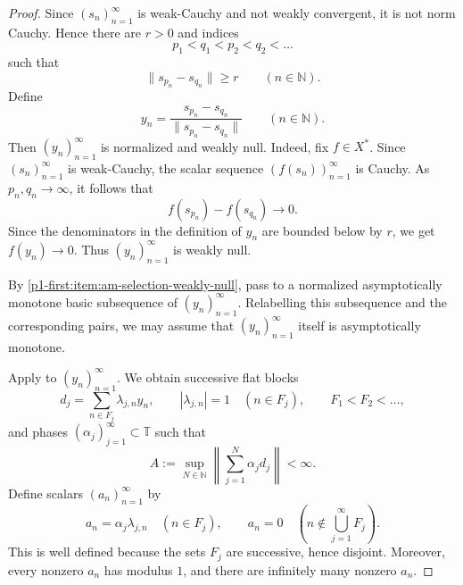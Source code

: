 \documentclass[11pt,reqno]{amsart}
\makeatletter
\theoremstyle{plain}
\theoremstyle{definition}
\newcommand{\N}{\mathbb N}
\newcommand{\T}{\mathbb T}
\newcounter{problempaper}
\newenvironment{problempaperbody}{%
  \setcounter{subsection}{0}%
  \setcounter{subsubsection}{0}%
  \setcounter{paragraph}{0}%
  \renewcommand{\thesubsection}{\arabic{subsection}}%
  \renewcommand{\thesubsubsection}{\thesubsection.\arabic{subsubsection}}%
  \renewcommand{\theparagraph}{\thesubsubsection.\arabic{paragraph}}%
  \let\problem@outersection\section
  \let\problem@outersubsection\subsection
  \let\problem@outersubsubsection\subsubsection
  \let\problem@outerparagraph\paragraph
  \let\section\problem@papersection
  \let\subsection\problem@papersubsection
  \let\subsubsection\problem@papersubsubsection
}{%
  \let\section\problem@outersection
  \let\subsection\problem@outersubsection
  \let\subsubsection\problem@outersubsubsection
  \let\paragraph\problem@outerparagraph
}
\newcommand{\problem@target}[2]{%
  \hypertarget{problem-\theproblempaper-#1-#2}{}%
}
\newcommand{\problem@paperheading}[3]{%
  \par\bigskip
  \problem@target{#1}{#2}%
  \noindent{\large\bfseries #2.\quad #3\par}%
  \nobreak\smallskip
}
\newcommand{\problem@papersubheading}[3]{%
  \par\medskip
  \problem@target{#1}{#2}%
  \noindent{\normalsize\bfseries #2.\quad #3\par}%
  \nobreak\smallskip
}
\newcommand{\problem@papersubsubheading}[3]{%
  \par\smallskip
  \problem@target{#1}{#2}%
  \noindent{\normalsize\itshape #2.\quad #3.\ }%
}
\def\problem@papersection{%
  \@ifstar{\problem@papersectionstar}{\problem@papersectionnostar}%
}
\def\problem@papersectionstar#1{%
  \par\bigskip\noindent{\large\bfseries #1\par}\nobreak\smallskip
}
\def\problem@papersectionnostar#1{%
  \refstepcounter{subsection}%
  \setcounter{subsubsection}{0}%
  \setcounter{paragraph}{0}%
  \problem@paperheading{section}{\thesubsection}{#1}%
  \problem@writecontentsline{section}{\thesubsection}{#1}%
}
\def\problem@papersubsection{%
  \@ifstar{\problem@papersubsectionstar}{\problem@papersubsectionnostar}%
}
\def\problem@papersubsectionstar#1{%
  \par\medskip\noindent{\normalsize\bfseries #1\par}\nobreak\smallskip
}
\def\problem@papersubsectionnostar#1{%
  \refstepcounter{subsubsection}%
  \setcounter{paragraph}{0}%
  \problem@papersubheading{subsection}{\thesubsubsection}{#1}%
  \problem@writecontentsline{subsection}{\thesubsubsection}{#1}%
}
\def\problem@papersubsubsection{%
  \@ifstar{\problem@papersubsubsectionstar}{\problem@papersubsubsectionnostar}%
}
\def\problem@papersubsubsectionstar#1{%
  \par\smallskip\noindent{\normalsize\itshape #1.\ }%
}
\def\problem@papersubsubsectionnostar#1{%
  \refstepcounter{paragraph}%
  \problem@papersubsubheading{subsubsection}{\theparagraph}{#1}%
  \problem@writecontentsline{subsubsection}{\theparagraph}{#1}%
}
\newcommand{\problem@writecontentsline}[3]{%
  \begingroup
  \protected@write\@auxout{}{%
    \string\problemcontentsentry{\theproblempaper}{#1}{#2}{#3}{\thepage}%
  }%
  \endgroup
}
\newcommand{\problemcontentsentry}[5]{%
  \@ifundefined{problemcontents@#1}{%
    \expandafter\gdef\csname problemcontents@#1\endcsname{}%
  }{}%
  \expandafter\g@addto@macro\csname problemcontents@#1\endcsname{%
    \problemcontentsline{#1}{#2}{#3}{#4}{#5}%
  }%
}
\newcommand{\problemcontentslink}[4]{%
  \hyperlink{problem-#1-#2-#3}{#4}%
}
\newcommand{\problemcontentsline}[5]{%
  \ifstrequal{#2}{section}{%
    \par\noindent
    \problemcontentslink{#1}{#2}{#3}{\makebox[2.5em][l]{#3}#4}%
    \nobreak\dotfill
    \problemcontentslink{#1}{#2}{#3}{#5}\par
  }{%
    \ifstrequal{#2}{subsection}{%
      \par\noindent\hspace*{1.5em}%
      \problemcontentslink{#1}{#2}{#3}{\makebox[3.5em][l]{#3}#4}%
      \nobreak\dotfill
      \problemcontentslink{#1}{#2}{#3}{#5}\par
    }{%
      \par\noindent\hspace*{3em}%
      \problemcontentslink{#1}{#2}{#3}{\makebox[4.5em][l]{#3}#4}%
      \nobreak\dotfill
      \problemcontentslink{#1}{#2}{#3}{#5}\par
    }%
  }%
}
\makeatother
\begin{document}
\begin{problempaperbody}
\begin{proof}
Since $(s_n)_{n=1}^{\infty}$ is weak-Cauchy and not weakly convergent, it is not norm Cauchy. Hence there are $r>0$ and indices
\begin{equation*}
        p_1<q_1<p_2<q_2<\ldots
\end{equation*}
such that
\begin{equation}
\label{p1-first:eq:diff-lower}
        \|s_{p_n}-s_{q_n}\|\geq r \qquad(n\in\N).
\end{equation}
Define
\begin{equation*}
        y_n=\frac{s_{p_n}-s_{q_n}}{\|s_{p_n}-s_{q_n}\|} \qquad(n\in\N).
\end{equation*}
Then $(y_n)_{n=1}^{\infty}$ is normalized and weakly null. Indeed, fix $f\in X^*$. Since $(s_n)_{n=1}^{\infty}$ is weak-Cauchy, the scalar sequence $(f(s_n))_{n=1}^{\infty}$ is Cauchy. As $p_n,q_n\to\infty$, it follows that
\begin{equation*}
        f(s_{p_n})-f(s_{q_n})\longrightarrow 0.
\end{equation*}
Since the denominators in the definition of $y_n$ are bounded below by $r$, we get $f(y_n)\to0$. Thus $(y_n)_{n=1}^{\infty}$ is weakly null.

By  \ref{p1-first:item:am-selection-weakly-null}, pass to a normalized asymptotically monotone basic subsequence of $(y_n)_{n=1}^{\infty}$. Relabelling this subsequence and the corresponding pairs, we may assume that $(y_n)_{n=1}^{\infty}$ itself is asymptotically monotone.

Apply  to $(y_n)_{n=1}^{\infty}$. We obtain successive flat blocks
\begin{equation*}
        d_j=\sum_{n\in F_j}\lambda_{j,n}y_n, \qquad |\lambda_{j,n}|=1 \quad(n\in F_j), \qquad F_1<F_2<\ldots,
\end{equation*}
and phases $(\alpha_j)_{j=1}^{\infty}\subset\T$ such that
\begin{equation}
\label{p1-first:eq:bad-strong}
        A:=\sup_{N\in\N}\left\|\sum_{j=1}^{N}\alpha_jd_j\right\|<\infty.
\end{equation}
Define scalars $(a_n)_{n=1}^{\infty}$ by
\begin{equation*}
        a_n=\alpha_j\lambda_{j,n} \quad(n\in F_j), \qquad a_n=0 \quad\left(n\notin\bigcup_{j=1}^{\infty}F_j\right).
\end{equation*}
This is well defined because the sets $F_j$ are successive, hence disjoint. Moreover, every nonzero $a_n$ has modulus $1$, and there are infinitely many nonzero $a_n$.


\end{proof}
\end{problempaperbody}
\end{document}
